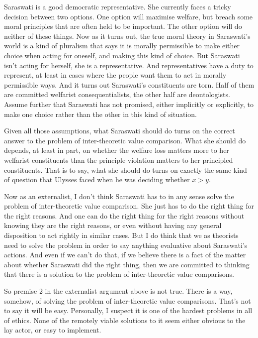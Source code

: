 \gls{Saraswati} is a good democratic representative. She currently faces a tricky decision between two options. One option will maximise welfare, but breach some moral principles that are often held to be important. The other option will do neither of these things. Now as it turns out, the true moral theory in \gls{Saraswati}'s world is a kind of pluralism that says it is morally permissible to make either choice when acting for oneself, and making this kind of choice. But \gls{Saraswati} isn't acting for herself, she is a representative. And representatives have a duty to represent, at least in cases where the people want them to act in morally permissible ways. And it turns out \gls{Saraswati}'s constituents are torn. Half of them are committed welfarist consequentialists, the other half are deontologists. Assume further that \gls{Saraswati} has not promised, either implicitly or explicitly, to make one choice rather than the other in this kind of situation.

Given all those assumptions, what \gls{Saraswati} should do turns on the correct answer to the problem of inter-theoretic value comparison. What she should do depends, at least in part, on whether the welfare loss matters more to her welfarist constituents than the principle violation matters to her principled constituents. That is to say, what she should do turns on exactly the same kind of question that \gls{Ulysses} faced when he was deciding whether $x > y$.

Now as an externalist, I don't think \gls{Saraswati} has to in any sense solve the problem of inter-theoretic value comparison. She just has to do the right thing for the right reasons. And one can do the right thing for the right reasons without knowing they are the right reasons, or even without having any general disposition to act rightly in similar cases. But I do think that we as theorists need to solve the problem in order to say anything evaluative about \gls{Saraswati}'s actions. And even if we can't do that, if we believe there is a fact of the matter about whether \gls{Saraswati} did the right thing, then we are committed to thinking that there is a solution to the problem of inter-theoretic value comparisons.

So premise 2 in the externalist argument above is not true. There is a way, somehow, of solving the problem of inter-theoretic value comparisons. That's not to say it will be easy. Personally, I suspect it is one of the hardest problems in all of ethics. None of the remotely viable solutions to it seem either obvious to the lay actor, or easy to implement.

